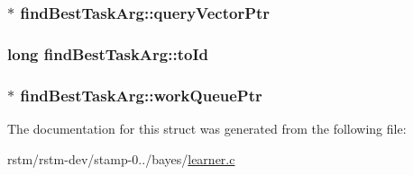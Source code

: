 \hypertarget{structfindBestTaskArg_a6d9b010988ec1af3a2109606cd8c549f}{
\subsubsection[{query\-Vector\-Ptr}]{$\ast$ find\-Best\-Task\-Arg\-::query\-Vector\-Ptr}}\label{structfindBestTaskArg_a6d9b010988ec1af3a2109606cd8c549f}
\hypertarget{structfindBestTaskArg_af91b96ead12e1cfa6238264c927ff346}{
\subsubsection[{to\-Id}]{\setlength{\rightskip}{0pt plus 5cm}long find\-Best\-Task\-Arg\-::to\-Id}}\label{structfindBestTaskArg_af91b96ead12e1cfa6238264c927ff346}
\hypertarget{structfindBestTaskArg_a63d6c4ace7034e3462bd320f6d17281e}{
\subsubsection[{work\-Queue\-Ptr}]{$\ast$ find\-Best\-Task\-Arg\-::work\-Queue\-Ptr}}\label{structfindBestTaskArg_a63d6c4ace7034e3462bd320f6d17281e}


The documentation for this struct was generated from the following file\-:\begin{DoxyCompactItemize}
\item 
rstm/rstm-\/dev/stamp-\/0../bayes/\hyperlink{learner_8c}{learner.\-c}\end{DoxyCompactItemize}
